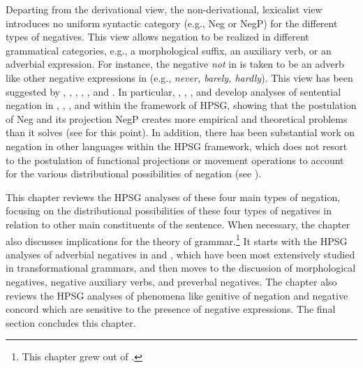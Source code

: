 \documentclass[output=paper
 	        ,biblatex
                ,babelshorthands
                ,newtxmath
                ,draftmode
                ,colorlinks, citecolor=brown
]{langscibook}
\begin{document}
Departing from the derivational view, the non-derivational, lexicalist view
introduces no uniform syntactic category (e.g., Neg or NegP) for the different types of negatives. This view allows negation to be realized in different grammatical categories, e.g., a morphological suffix, an auxiliary verb, or an adverbial expression. For instance, the negative \emph{not} in  is taken to be an adverb like other negative expressions in  (e.g., \textit{never, barely, hardly}). This view has been suggested by \citet{Jackendoff:72}, \citet{Baker:91}, \citet{Ernst:92}, \citet{AG:97}, \citet{Kim:00}, and \citet{Warner2000a-u}. In particular,
\citet{KS:96}, \citet{AG:97}, \citet{Kim:00}, and \citet{KS:02} develop analyses of sentential negation in , , , and  within the framework of HPSG, showing that the postulation of Neg and its projection NegP creates more empirical and theoretical problems than it solves (see \citealt{Newmeyer:2006} for this point).
In addition, there has been substantial work on negation in other languages within the HPSG framework, which
does not resort to the postulation of functional projections or movement operations to account for the various distributional possibilities
of negation (see \citealt{PK:99, BJ:00, Prz:00, Kupsc:02, Swart:02, Borsley:05, Crysmann:10, Bender:13}).

This chapter reviews the HPSG analyses of these four main types of negation,
focusing on the distributional possibilities of these four types of negatives in
relation to other main constituents of the sentence. When
necessary, the chapter also discusses implications for
the theory of grammar.\footnote{This chapter grew out of \citet{Kim:00,kim:18}.}
It starts with the HPSG analyses of adverbial negatives in  and , which have been most extensively studied in transformational grammars,
and then moves to the discussion of morphological
negatives, negative auxiliary verbs, and preverbal negatives. The chapter
also reviews the HPSG analyses of phenomena like genitive of negation and
negative concord which are sensitive to the presence of negative expressions. The
final section concludes this chapter.
\end{document}
